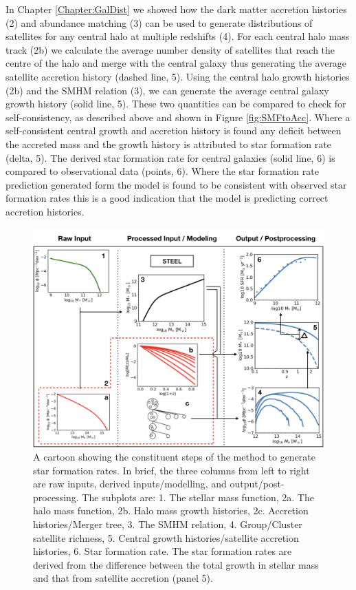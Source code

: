 In Chapter \ref{Chapter:GalDist} we showed how the \textcolor{MPLred}{dark matter accretion histories (2)} and abundance matching (3) can be used to generate \textcolor{MPLblue}{distributions of satellites for any central halo at multiple redshifts (4)}. For each \textcolor{MPLred}{central halo mass track (2b)} we calculate the average number density of satellites that reach the centre of the halo and merge with the central galaxy \textcolor{MPLblue}{thus generating the average satellite accretion history (dashed line, 5)}. \textcolor{MPLred}{Using the central halo growth histories (2b)} and the SMHM relation (3), we can generate the \textcolor{MPLblue}{average central galaxy growth history (solid line, 5)}. These two quantities can be compared to check for self-consistency, as described above and shown in Figure \ref{fig:SMFtoAcc}. Where a self-consistent central growth and accretion history is found any deficit between the accreted mass and the growth history is attributed to \textcolor{MPLblue}{star formation rate (delta, 5)}. \textcolor{MPLblue}{The derived star formation rate for central galaxies (solid line, 6) is compared to observational data (points, 6)}. Where the star formation rate prediction generated form the model is found to be consistent with observed star formation rates this is a good indication that the model is predicting correct accretion histories.

\begin{figure}[h]
	\centering
	\includegraphics[width = \linewidth]{Figures/Chapter4/SFRFullCartoon.png}
    \caption{A cartoon showing the constituent steps of the method to generate star formation rates. In brief, the three columns from left to right are raw inputs, derived inputs/modelling, and output/post-processing. The subplots are: 1. The stellar mass function, 2a. The halo mass function, 2b. Halo mass growth histories, 2c. Accretion histories/Merger tree, 3. The SMHM relation, 4. Group/Cluster satellite richness, 5. Central growth histories/satellite accretion histories, 6. Star formation rate. The star formation rates are derived from the difference between the total growth in stellar mass and that from satellite accretion (panel 5).}
	\label{fig:SFRDerevation_Cartoon}
\end{figure}

